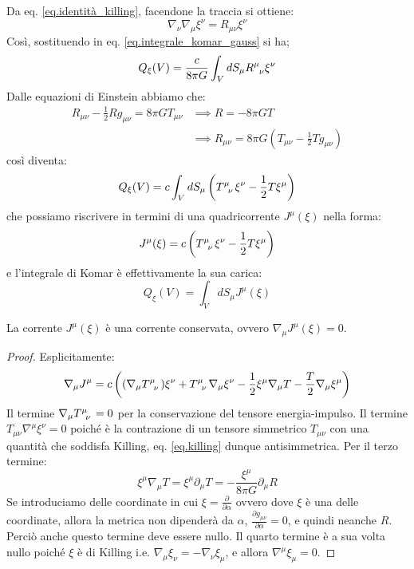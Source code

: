 Da eq. \ref{eq.identità_killing}, facendone la traccia si ottiene:
\begin{equation*}
    \nabla_\nu \nabla_\mu \xi^\nu = R_{\mu\nu}\xi^\nu
\end{equation*}
Così, sostituendo in eq. \ref{eq.integrale_komar_gauss} si ha;
\begin{equation*}
    Q_\xi(V) = \frac{c}{8\pi G}\int_V dS_\mu \tensor{R}{^\mu_\nu}\xi^\nu
\end{equation*}
Dalle equazioni di Einstein abbiamo che:
\begin{align*}
    R_{\mu\nu} - \frac{1}{2}Rg_{\mu\nu} = 8\pi G T_{\mu\nu} &\implies R= - 8\pi G T \\
    &\implies R_{\mu\nu} = 8\pi G(T_{\mu\nu} - \frac{1}{2}Tg_{\mu\nu})
\end{align*}
così diventa:
\begin{equation*}
    Q_\xi(V) = c\int_V dS_\mu \left( \tensor{T}{^\mu_\nu}\xi^\nu - \frac{1}{2}T\xi^\mu \right)
\end{equation*}
che possiamo riscrivere in termini di una quadricorrente $J^\mu(\xi)$ nella forma:
\begin{equation*}
    J^\mu(\xi) = c\left( \tensor{T}{^\mu_\nu}\xi^\nu - \frac{1}{2}T\xi^\mu \right)
\end{equation*}
e l'integrale di Komar è effettivamente la sua carica:
\begin{equation}
    Q_\xi (V) = \int_V dS_\mu J^\mu(\xi)
    \label{eq.integrale_komar_corrente}
\end{equation}
\begin{lemma}
La corrente $J^\mu(\xi)$ è una corrente conservata, ovvero $\nabla_\mu J^\mu(\xi) =0$.
\end{lemma}
\begin{proof}
Esplicitamente:
\begin{equation*}
    \nabla_\mu J^\mu = c\left( (\nabla_\mu \tensor{T}{^\mu_\nu})\xi^\nu + \tensor{T}{^\mu_\nu}\nabla_\mu \xi^\nu - \frac{1}{2}\xi^\mu \nabla_\mu T - \frac{T}{2}\nabla_\mu \xi^\mu \right)
\end{equation*}
Il termine $\nabla_\mu \tensor{T}{^\mu_\nu} = 0$ per la conservazione del tensore energia-impulso. Il termine $T_{\mu\nu}\nabla^\mu\xi^\nu = 0$ poiché è la contrazione di un tensore simmetrico $T_{\mu\nu}$ con una quantità che soddisfa Killing, eq. \ref{eq.killing} dunque antisimmetrica.
Per il terzo termine:
\begin{equation*}
    \xi^\mu \nabla_\mu T = \xi^\mu \partial_\mu T = - \frac{\xi^\mu}{8\pi G}\partial_\mu R
\end{equation*}
Se introduciamo delle coordinate in cui $\xi = \frac{\partial}{\partial \alpha}$ ovvero dove $\xi$ è una delle coordinate, allora la metrica non dipenderà da $\alpha$, $\frac{\partial g_{\mu\nu}}{\partial \alpha}=0$, e quindi neanche $R$. Perciò anche questo termine deve essere nullo.
Il quarto termine è a sua volta nullo poiché $\xi$ è di Killing i.e. $\nabla_\mu\xi_\nu = - \nabla_\nu\xi_\mu$, e allora $\nabla^\mu\xi_\mu = 0$.
\end{proof}

